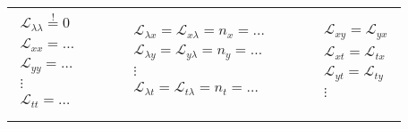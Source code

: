 \begin{enumerate}[itemsep=1ex]
    \begin{tabular}{lllll}
        $\begin{matrix}
        \mathcal{L}_{\lambda \lambda} \stackrel{!}{=} 0\\
        \mathcal{L}_{xx} = \dots\\
        \mathcal{L}_{yy} = \dots\\
        \vdots \\
        \mathcal{L}_{tt} = \dots\\
        \end{matrix}$
        &$\,\,\,\,\,\,\,\,$&
        $\begin{matrix}
        \mathcal{L}_{\lambda x} = \mathcal{L}_{x\lambda} = n_x = \dots\\
        \mathcal{L}_{\lambda y} = \mathcal{L}_{y\lambda} = n_y =\dots\\
        \vdots \\
        \mathcal{L}_{\lambda t} = \mathcal{L}_{t\lambda} = n_t =\dots\\
        \end{matrix}$
        &$\,\,\,\,\,\,\,\,$&
        $\begin{matrix}
        \mathcal{L}_{xy} = \mathcal{L}_{yx}\\
        \mathcal{L}_{xt} = \mathcal{L}_{tx}\\
        \mathcal{L}_{yt} = \mathcal{L}_{ty}\\
        \vdots \\
        \end{matrix}$
    \end{tabular}


\end{enumerate}
